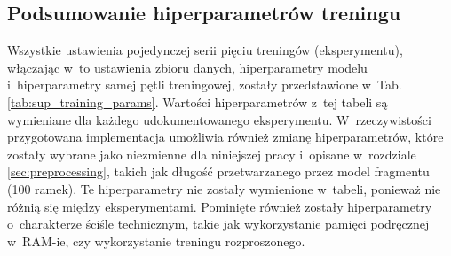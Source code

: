 \subsection{Podsumowanie hiperparametrów treningu}

Wszystkie ustawienia pojedynczej serii pięciu treningów (eksperymentu), włączając w~to ustawienia zbioru danych, hiperparametry modelu i~hiperparametry samej pętli treningowej, zostały przedstawione w~Tab. \ref{tab:sup_training_params}. Wartości hiperparametrów z~tej tabeli są wymieniane dla każdego udokumentowanego eksperymentu. W~rzeczywistości przygotowana implementacja umożliwia również zmianę hiperparametrów, które zostały wybrane jako niezmienne dla niniejszej pracy i~opisane w~rozdziale \ref{sec:preprocessing}, takich jak długość przetwarzanego przez model fragmentu (100 ramek). Te hiperparametry nie zostały wymienione w~tabeli, ponieważ nie różnią się między eksperymentami. Pominięte również zostały hiperparametry o~charakterze ściśle technicznym, takie jak wykorzystanie pamięci podręcznej w~RAM-ie, czy wykorzystanie treningu rozproszonego.


